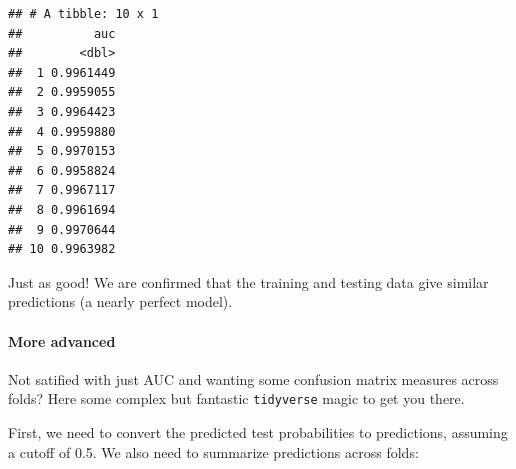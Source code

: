 \documentclass[]{article}
\newenvironment{Shaded}{\begin{snugshade}}{\end{snugshade}}
\newcommand{\KeywordTok}[1]{\textcolor[rgb]{0.13,0.29,0.53}{\textbf{#1}}}
\newcommand{\DataTypeTok}[1]{\textcolor[rgb]{0.13,0.29,0.53}{#1}}
\newcommand{\FloatTok}[1]{\textcolor[rgb]{0.00,0.00,0.81}{#1}}
\newcommand{\StringTok}[1]{\textcolor[rgb]{0.31,0.60,0.02}{#1}}
\newcommand{\OperatorTok}[1]{\textcolor[rgb]{0.81,0.36,0.00}{\textbf{#1}}}
\newcommand{\NormalTok}[1]{#1}
\let\oldparagraph\paragraph
\renewcommand{\paragraph}[1]{\oldparagraph{#1}\mbox{}}
\begin{document}
\begin{Shaded}
\end{Shaded}

\begin{verbatim}
## # A tibble: 10 x 1
##          auc
##        <dbl>
##  1 0.9961449
##  2 0.9959055
##  3 0.9964423
##  4 0.9959880
##  5 0.9970153
##  6 0.9958824
##  7 0.9967117
##  8 0.9961694
##  9 0.9970644
## 10 0.9963982
\end{verbatim}

Just as good! We are confirmed that the training and testing data give
similar predictions (a nearly perfect model).

\paragraph{More advanced}\label{more-advanced}

Not satified with just AUC and wanting some confusion matrix measures
across folds? Here some complex but fantastic \texttt{tidyverse} magic
to get you there.

First, we need to convert the predicted test probabilities to
predictions, assuming a cutoff of 0.5. We also need to summarize
predictions across folds:

\begin{Shaded}
\end{Shaded}
\end{document}
